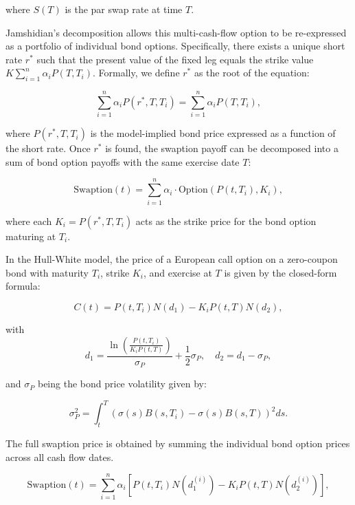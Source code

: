where \( S(T) \) is the par swap rate at time \( T \).

Jamshidian's decomposition allows this multi-cash-flow option to be re-expressed as a portfolio of individual bond options. Specifically, there exists a unique short rate \( r^* \) such that the present value of the fixed leg equals the strike value \( K \sum_{i=1}^n \alpha_i P(T, T_i) \). Formally, we define \( r^* \) as the root of the equation:

\begin{equation}
	\sum_{i=1}^n \alpha_i P(r^*, T, T_i) = \sum_{i=1}^n \alpha_i P(T, T_i),
\end{equation}

where \( P(r^*, T, T_i) \) is the model-implied bond price expressed as a function of the short rate. Once \( r^* \) is found, the swaption payoff can be decomposed into a sum of bond option payoffs with the same exercise date \( T \):

\begin{equation}
	\text{Swaption}(t) = \sum_{i=1}^n \alpha_i \cdot \text{Option}(P(t, T_i), K_i),
\end{equation}

where each \( K_i = P(r^*, T, T_i) \) acts as the strike price for the bond option maturing at \( T_i \).

In the Hull-White model, the price of a European call option on a zero-coupon bond with maturity \( T_i \), strike \( K_i \), and exercise at \( T \) is given by the closed-form formula:

\begin{equation}
	C(t) = P(t, T_i) N(d_1) - K_i P(t, T) N(d_2),
\end{equation}

with
\begin{equation}
	d_1 = \frac{\ln\left( \frac{P(t, T_i)}{K_i P(t, T)} \right)}{\sigma_P} + \frac{1}{2} \sigma_P, \quad
	d_2 = d_1 - \sigma_P,
\end{equation}

and \( \sigma_P \) being the bond price volatility given by:

\begin{equation}
	\sigma_P^2 = \int_t^T \left( \sigma(s) B(s, T_i) - \sigma(s) B(s, T) \right)^2 ds.
\end{equation}

The full swaption price is obtained by summing the individual bond option prices across all cash flow dates.

\begin{equation}
	\text{Swaption}(t) = \sum_{i=1}^n \alpha_i \left[ P(t, T_i) N(d_1^{(i)}) - K_i P(t, T) N(d_2^{(i)}) \right],
\end{equation}

